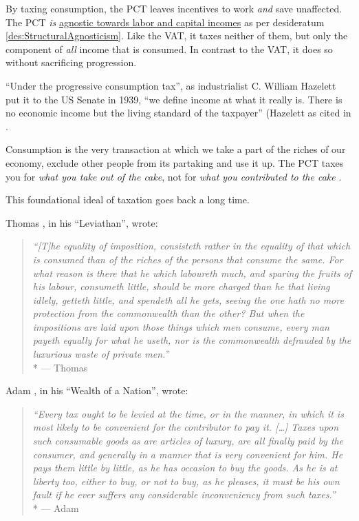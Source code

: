 By taxing consumption, the PCT leaves incentives to work \emph{and} save unaffected.
The PCT \emph{is} \hyperref[des:StructuralAgnosticism]{agnostic towards labor and capital incomes} as per desideratum \ref{des:StructuralAgnosticism}.
Like the VAT, it taxes neither of them, but only the component of \emph{all} income that is consumed.
In contrast to the VAT, it does so without sacrificing progression.

``Under the progressive consumption tax'', as industrialist C.
William Hazelett put it to the US Senate in 1939, ``we define income at what it really is.
There is no economic income but the living standard of the taxpayer'' (Hazelett as cited in \citep[15]{Bank2004}.

Consumption is the very transaction at which we take a part of the riches of our economy, exclude other people from its partaking and use it up.
The PCT taxes you for \emph{what you take out of the cake}, not for \emph{what you contributed to the cake} \citep[58]{Seidman1997}.

This foundational ideal of taxation goes back a long time.

Thomas \citeauthor{Hobbes-1651-aa}, in his ``Leviathan'', wrote:

\begin{quotation}
	\emph{``[T]he equality of imposition, consisteth rather in the equality of that which is consumed than of the riches of the persons that consume the same.
	For what reason is there that he which laboureth much, and sparing the fruits of his labour, consumeth little, should be more charged than he that living idlely, getteth little, and spendeth all he gets, seeing the one hath no more protection from the commonwealth than the other?
	But when the impositions are laid upon those things which men consume, every man payeth equally for what he useth, nor is the commonwealth defrauded by the luxurious waste of private men.''}
	\\*
	--- Thomas \citet[386]{Hobbes-1651-aa}
\end{quotation}

Adam \citeauthor{Smith-1776-lq}, in his ``Wealth of a Nation'', wrote:

\begin{quotation}
	\emph{``Every tax ought to be levied at the time, or in the manner, in which it is most likely to be convenient for the contributor to pay it.
	[\ldots]
	Taxes upon such consumable goods as are articles of luxury, are all finally paid by the consumer, and generally in a manner that is very convenient for him.
	He pays them little by little, as he has occasion to buy the goods.
	As he is at liberty too, either to buy, or not to buy, as he pleases, it must be his own fault if he ever suffers any considerable inconveniency from such taxes.''}
	\\*
	--- Adam \citet[778]{Smith-1776-lq}
\end{quotation}

